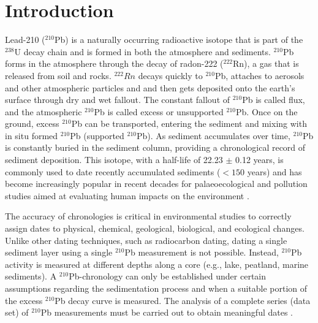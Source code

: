 \documentclass [10pt] {article}
\begin{document}
\section{Introduction}

	Lead-210 ($^{210}$Pb) is a naturally occurring radioactive isotope that is part of the $^{238}$U decay chain and is formed in both the atmosphere and sediments. $^{210}$Pb forms in the atmosphere through the decay of radon-222 ($^{222}$Rn), a gas that is released from soil and rocks. $^{222}Rn$ decays quickly to $^{210}$Pb, attaches to aerosols and other atmospheric particles and and then gets deposited onto the earth's surface through dry and wet fallout. The constant fallout of $^{210}$Pb is called flux, and the atmospheric $^{210}$Pb is called excess or unsupported $^{210}$Pb. Once on the ground, excess $^{210}$Pb can be transported, entering the sediment and mixing with in situ formed $^{210}$Pb (supported $^{210}$Pb). As sediment accumulates over time, $^{210}$Pb is constantly buried in the sediment column, providing a chronological record of sediment deposition. This isotope, with a half-life of 22.23 $\pm$ 0.12 years, is commonly used to date recently accumulated sediments ($<150$ years) and has become increasingly popular in recent decades for palaeoecological and pollution studies aimed at evaluating human impacts on the environment \citep[e.g.,][]{Courtney2019}.

	The accuracy of chronologies is critical in environmental studies to correctly assign dates to physical, chemical, geological, biological, and ecological changes. Unlike other dating techniques, such as radiocarbon dating, dating a single sediment layer using a single $^{210}$Pb measurement is not possible. Instead, $^{210}$Pb activity is measured at different depths along a core (e.g., lake, peatland, marine sediments). A $^{210}$Pb-chronology can only be established under certain assumptions regarding the sedimentation process and when a suitable portion of the excess $^{210}$Pb decay curve is measured. The analysis of a complete series (data set) of $^{210}$Pb measurements must be carried out to obtain meaningful dates \citet{Aquino2018}.
\end{document}
